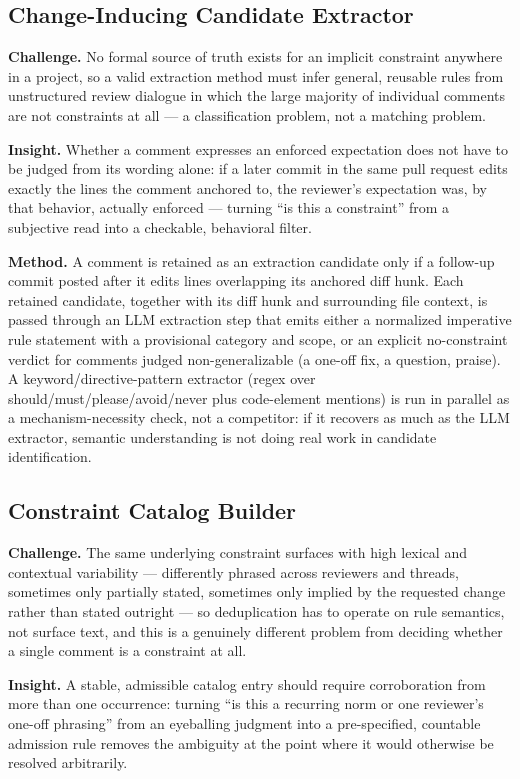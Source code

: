 \documentclass[11pt]{article}
\begin{document}
\subsection{Change-Inducing Candidate Extractor}
\textbf{Challenge.} No formal source of truth exists for an implicit constraint anywhere in a project, so a valid extraction method must infer general, reusable rules from unstructured review dialogue in which the large majority of individual comments are not constraints at all --- a classification problem, not a matching problem.

\textbf{Insight.} Whether a comment expresses an enforced expectation does not have to be judged from its wording alone: if a later commit in the same pull request edits exactly the lines the comment anchored to, the reviewer's expectation was, by that behavior, actually enforced --- turning ``is this a constraint'' from a subjective read into a checkable, behavioral filter.

\textbf{Method.} A comment is retained as an extraction candidate only if a follow-up commit posted after it edits lines overlapping its anchored diff hunk. Each retained candidate, together with its diff hunk and surrounding file context, is passed through an LLM extraction step that emits either a normalized imperative rule statement with a provisional category and scope, or an explicit no-constraint verdict for comments judged non-generalizable (a one-off fix, a question, praise). A keyword/directive-pattern extractor (regex over should/must/please/avoid/never plus code-element mentions) is run in parallel as a mechanism-necessity check, not a competitor: if it recovers as much as the LLM extractor, semantic understanding is not doing real work in candidate identification.

\subsection{Constraint Catalog Builder}
\textbf{Challenge.} The same underlying constraint surfaces with high lexical and contextual variability --- differently phrased across reviewers and threads, sometimes only partially stated, sometimes only implied by the requested change rather than stated outright --- so deduplication has to operate on rule semantics, not surface text, and this is a genuinely different problem from deciding whether a single comment is a constraint at all.

\textbf{Insight.} A stable, admissible catalog entry should require corroboration from more than one occurrence: turning ``is this a recurring norm or one reviewer's one-off phrasing'' from an eyeballing judgment into a pre-specified, countable admission rule removes the ambiguity at the point where it would otherwise be resolved arbitrarily.
\end{document}
